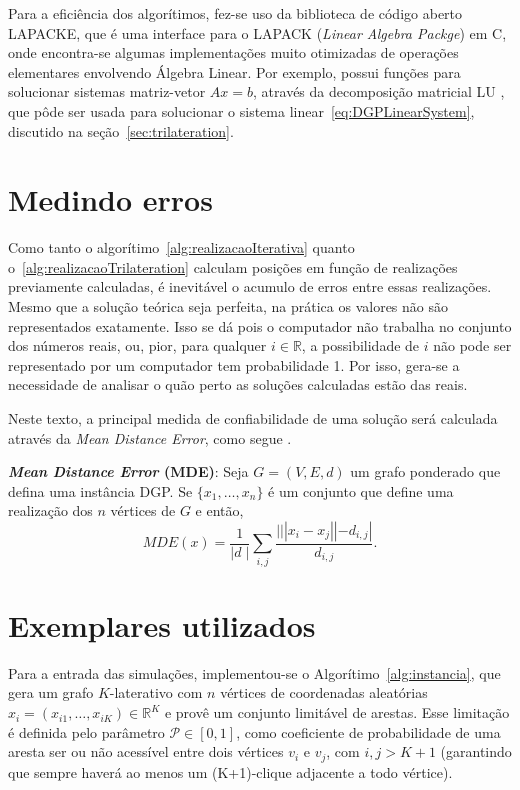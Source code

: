\documentclass[a4paper,12pt]{report}
\begin{document}
	Para a eficiência dos algorítimos, fez-se uso da biblioteca de código aberto LAPACKE, que é uma interface para o LAPACK (\textit{Linear Algebra Packge}) em C, onde encontra-se algumas implementações muito otimizadas de operações elementares envolvendo Álgebra Linear. Por exemplo, possui funções para solucionar sistemas matriz-vetor $Ax = b$, através da decomposição matricial LU \cite{AlgebraLinearElon}, que pôde ser usada para solucionar o sistema linear~\ref{eq:DGPLinearSystem}, discutido na seção~\ref{sec:trilateration}.
	
	\section{Medindo erros}%
	
	Como tanto o algorítimo~\ref{alg:realizacaoIterativa} quanto o~\ref{alg:realizacaoTrilateration} calculam posições em função de realizações previamente calculadas, é inevitável o acumulo de erros entre essas realizações. Mesmo que a solução teórica seja perfeita, na prática os valores não são representados exatamente. Isso se dá pois o computador não trabalha no conjunto dos números reais, ou, pior, para qualquer $i \in\mathbb{R}$, a possibilidade de $i$ não pode ser representado por um computador tem probabilidade 1. Por isso, gera-se a necessidade de analisar o quão perto as soluções calculadas estão das reais.
	
	Neste texto, a principal medida de confiabilidade de uma solução será calculada através da \textit{Mean Distance Error}, como segue \cite{mucherino:BP}.
	
	\begin{center}
		\begin{minipage}{0.9 \linewidth}
			\textbf{\textit{Mean Distance Error} (MDE)}: Seja $G= (V,E,d)$ um grafo ponderado que defina uma instância DGP. Se $\{x_1, \dots, x_n\}$ é um conjunto que define uma realização dos $n$ vértices de $G$ e então,
			$$MDE(x) = \frac{1}{|d\;|} \sum_{i,j}^{}\frac{|||x_i - x_j|| - d_{i,j}|}{d_{i,j}} .$$
		\end{minipage}
	\end{center}
	
	\section{Exemplares utilizados}
	Para a entrada das simulações, implementou-se o Algorítimo~\ref{alg:instancia}, que gera um grafo $K$-laterativo com $n$ vértices de coordenadas aleatórias $x_i = (x_{i1},\dots,x_{iK})\in \mathbb{R}^K$ e provê um conjunto limitável de arestas. Esse limitação é definida pelo parâmetro $\mathcal{P} \in [0,1]$, como coeficiente de probabilidade de uma aresta ser ou não acessível entre dois vértices $v_i$ e $v_j$, com $i,j>K+1$ (garantindo que sempre haverá ao menos um (K+1)-clique adjacente a todo vértice).
	\\
	
\end{document}
